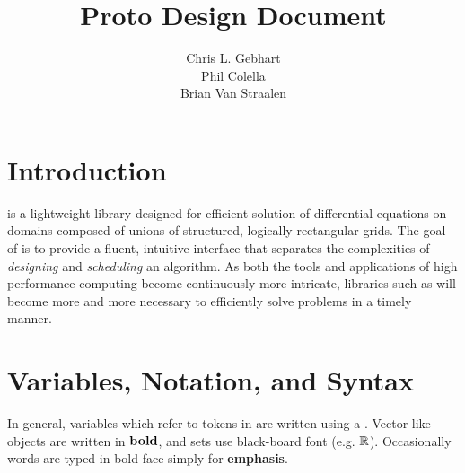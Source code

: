 \documentclass[12pt,a4paper]{article}
\title{Proto Design Document}
\author{Chris L. Gebhart\\Phil Colella \\ Brian Van Straalen}
\begin{document}
\lstset{language=C++,style=protostyle}
\maketitle

\section{Introduction}

\libname is a lightweight library designed for efficient solution of differential equations on domains composed of unions of structured, logically rectangular grids. The goal of \libname is to provide a fluent, intuitive interface that separates the complexities of \textit{designing} and \textit{scheduling} an algorithm. As both the tools and applications of high performance computing become continuously more intricate, libraries such as \libname will become more and more necessary to efficiently solve problems in a timely manner. 

\section{Variables, Notation, and Syntax}

In general, variables which refer to tokens in \libname are written using a . Vector-like objects are written in $\mathbf{bold}$, and sets use black-board font (e.g. $\mathbb{R}$). Occasionally words are typed in bold-face simply for \textbf{emphasis}. 
\end{document}
